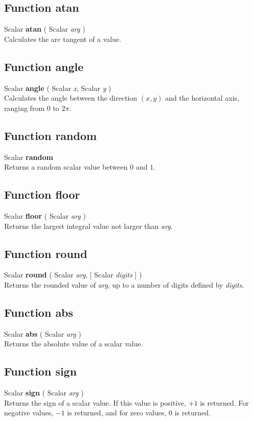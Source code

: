 \documentclass[10pt]{book}
\newcommand{\var}[1]{\textit{#1}}
\begin{document}
\subsection{Function atan \label{F:atan}}
Scalar \textbf{atan} ( Scalar \textit{arg} ) \\
Calculates the arc tangent of a value.

\subsection{Function angle \label{F:angle}}
Scalar \textbf{angle} ( Scalar \textit{x}, Scalar \textit{y} ) \\
Calculates the angle between the direction $(x,y)$ and the horizontal axis, ranging from $0$ to $2 \pi$.

\subsection{Function random \label{F:random}}
Scalar \textbf{random} \\
Returns a random scalar value between $0$ and $1$.

\subsection{Function floor \label{F:floor}}
Scalar \textbf{floor} ( Scalar \textit{arg} ) \\
Returns the largest integral value not larger than \var{arg}.

\subsection{Function round \label{F:round}}
Scalar \textbf{round} ( Scalar \textit{arg},  [ Scalar \textit{digits} ] ) \\
Returns the rounded value of \var{arg}, up to a number of digits defined by \var{digits}.

\subsection{Function abs \label{F:abs}}
Scalar \textbf{abs} ( Scalar \textit{arg} ) \\
Returns the absolute value of a scalar value.

\subsection{Function sign \label{F:sign}}
Scalar \textbf{sign} ( Scalar \textit{arg} ) \\
Returns the sign of a scalar value. If this value is positive, $+1$ is returned. For negative values, $-1$ is returned, and  for zero values, $0$ is returned.
\end{document}
